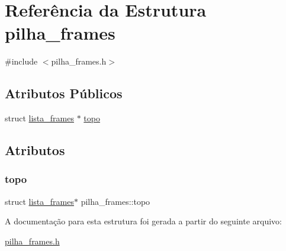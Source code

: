 \hypertarget{structpilha__frames}{}\section{Referência da Estrutura pilha\+\_\+frames}
\label{structpilha__frames}


{\ttfamily \#include $<$pilha\+\_\+frames.\+h$>$}

\subsection*{Atributos Públicos}
\begin{DoxyCompactItemize}
\item 
struct \hyperlink{structlista__frames}{lista\+\_\+frames} $\ast$ \hyperlink{structpilha__frames_a0f1e93df36de953f6ee6789cea5fd34f}{topo}
\end{DoxyCompactItemize}


\subsection{Atributos}
\mbox{\label{structpilha__frames_a0f1e93df36de953f6ee6789cea5fd34f}} 
\subsubsection{\texorpdfstring{topo}{topo}}
{\footnotesize\ttfamily struct \hyperlink{structlista__frames}{lista\+\_\+frames}$\ast$ pilha\+\_\+frames\+::topo}



A documentação para esta estrutura foi gerada a partir do seguinte arquivo\+:\begin{DoxyCompactItemize}
\item 
\hyperlink{pilha__frames_8h}{pilha\+\_\+frames.\+h}\end{DoxyCompactItemize}
